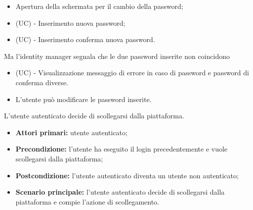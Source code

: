 \begin{itemize}
\begin{enumerate}[label=\lett]
\begin{itemize}
			\item Apertura della schermata per il cambio della password;
			\item (UC) - Inserimento nuova password;
			\item (UC) - Inserimento conferma nuova password.
		\end{itemize}
		Ma l'identity manager segnala che le due password inserite non coincidono
		\begin{itemize}
			\item (UC) - Visualizzazione messaggio di errore in caso di password e password di conferma diverse.
			\item L'utente può modificare le password inserite.
		\end{itemize}
	\end{enumerate}
\end{itemize}

L'utente autenticato decide di scollegarsi dalla piattaforma.
\begin{itemize}
    \item \textbf{Attori primari:} utente autenticato;
    \item \textbf{Precondizione:} l'utente ha eseguito il login precedentemente e vuole scollegarsi dalla piattaforma;
    \item \textbf{Postcondizione:} l'utente autenticato diventa un utente non autenticato;
    \item \textbf{Scenario principale:} l'utente autenticato decide di scollegarsi dalla piattaforma e compie l'azione di scollegamento.
\end{itemize}